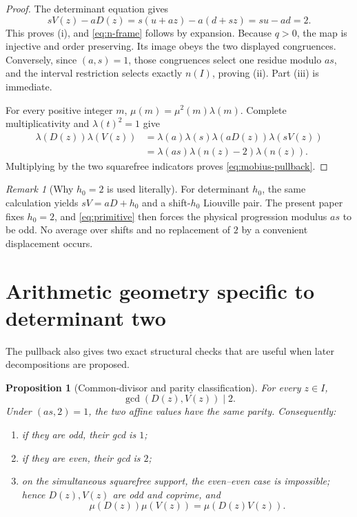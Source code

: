 \documentclass[11pt]{article}
\newtheorem{proposition}[theorem]{Proposition}
\theoremstyle{definition}
\theoremstyle{remark}
\newtheorem{remark}[theorem]{Remark}
\begin{document}
\begin{proof}
The determinant equation gives
\[
 sV(z)-aD(z)
 =s(u+az)-a(d+sz)=su-ad=2.
\]
This proves (i), and \eqref{eq:n-frame} follows by expansion.
Because \(q>0\), the map is injective and order preserving.  Its
image obeys the two displayed congruences.  Conversely, since
\((a,s)=1\), those congruences select one residue modulo \(as\), and
the interval restriction selects exactly \(n(I)\), proving (ii).
Part (iii) is immediate.

For every positive integer \(m\),
\(\mu(m)=\mu^2(m)\lambda(m)\).  Complete multiplicativity and
\(\lambda(t)^2=1\) give
\begin{align*}
 \lambda(D(z))\lambda(V(z))
 &=
 \lambda(a)\lambda(s)
 \lambda(aD(z))\lambda(sV(z))\\
 &=\lambda(as)\lambda(n(z)-2)\lambda(n(z)).
\end{align*}
Multiplying by the two squarefree indicators proves
\eqref{eq:mobius-pullback}.
\end{proof}

\begin{remark}[Why \(h_0=2\) is used literally]
For determinant \(h_0\), the same calculation yields
\(sV=aD+h_0\) and a shift-\(h_0\) Liouville pair.  The present paper
fixes \(h_0=2\), and \eqref{eq:primitive} then forces the physical
progression modulus \(as\) to be odd.  No average over shifts and no
replacement of \(2\) by a convenient displacement occurs.
\end{remark}

\section{Arithmetic geometry specific to determinant two}

The pullback also gives two exact structural checks that are useful
when later decompositions are proposed.

\begin{proposition}[Common-divisor and parity classification]
\label{prop:gcd-classification}
For every \(z\in I\),
\[
 \gcd(D(z),V(z))\mid2.
\]
Under \((as,2)=1\), the two affine values have the same parity.
Consequently:
\begin{enumerate}[label=(\roman*),leftmargin=2.2em]
\item if they are odd, their gcd is \(1\);
\item if they are even, their gcd is \(2\);
\item on the simultaneous squarefree support, the even--even case is
impossible; hence \(D(z),V(z)\) are odd and coprime, and
\begin{equation}
 \mu(D(z))\mu(V(z))
 =\mu(D(z)V(z)).
\label{eq:quadratic-compression}
\end{equation}
\end{enumerate}
\end{proposition}
\end{document}
